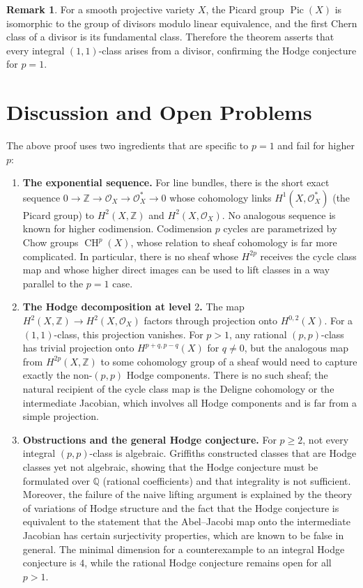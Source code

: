 \documentclass[12pt]{article}
\theoremstyle{plain}
\theoremstyle{definition}
\newtheorem{remark}[theorem]{Remark}
\begin{document}
\begin{remark}
For a smooth projective variety $X$, the Picard group $\operatorname{Pic}(X)$ is isomorphic to the group of divisors modulo linear equivalence, and the first Chern class of a divisor is its fundamental class. Therefore the theorem asserts that every integral $(1,1)$-class arises from a divisor, confirming the Hodge conjecture for $p=1$.
\end{remark}

\section{Discussion and Open Problems}

The above proof uses two ingredients that are specific to $p=1$ and fail for higher $p$:

\begin{enumerate}
    \item \textbf{The exponential sequence.}
    For line bundles, there is the short exact sequence $0 \to \mathbb Z \to \mathcal O_X \to \mathcal O_X^* \to 0$ whose cohomology links $H^1(X,\mathcal O_X^*)$ (the Picard group) to $H^2(X,\mathbb Z)$ and $H^2(X,\mathcal O_X)$.
    No analogous sequence is known for higher codimension.
    Codimension $p$ cycles are parametrized by Chow groups $\operatorname{CH}^p(X)$, whose relation to sheaf cohomology is far more complicated.
    In particular, there is no sheaf whose $H^{2p}$ receives the cycle class map and whose higher direct images can be used to lift classes in a way parallel to the $p=1$ case.

    \item \textbf{The Hodge decomposition at level $2$.}
    The map $H^2(X,\mathbb Z) \to H^2(X,\mathcal O_X)$ factors through projection onto $H^{0,2}(X)$.
    For a $(1,1)$-class, this projection vanishes.
    For $p>1$, any rational $(p,p)$-class has trivial projection onto $H^{p+q,p-q}(X)$ for $q\neq 0$, but the analogous map from $H^{2p}(X,\mathbb Z)$ to some cohomology group of a sheaf would need to capture exactly the non-$(p,p)$ Hodge components.
    There is no such sheaf; the natural recipient of the cycle class map is the Deligne cohomology or the intermediate Jacobian, which involves all Hodge components and is far from a simple projection.

    \item \textbf{Obstructions and the general Hodge conjecture.}
    For $p\geq 2$, not every integral $(p,p)$-class is algebraic.
    Griffiths \cite{griffiths} constructed classes that are Hodge classes yet not algebraic, showing that the Hodge conjecture must be formulated over $\mathbb Q$ (rational coefficients) and that integrality is not sufficient.
    Moreover, the failure of the naive lifting argument is explained by the theory of variations of Hodge structure and the fact that the Hodge conjecture is equivalent to the statement that the Abel–Jacobi map onto the intermediate Jacobian has certain surjectivity properties, which are known to be false in general.
    The minimal dimension for a counterexample to an integral Hodge conjecture is $4$, while the rational Hodge conjecture remains open for all $p>1$.
\end{enumerate}
\end{document}
